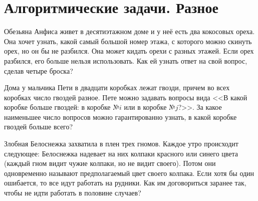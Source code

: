 

\section*{Алгоритмические задачи. Разное}


\begin{problems}

\item
Обезьяна Анфиса живет в десятиэтажном доме и у неё есть два кокосовых ореха.
Она хочет узнать, какой самый большой номер этажа, с которого можно скинуть
орех, но он бы не разбился.
Она может кидать орехи с разных этажей.
Если орех разбился, его больше нельзя использовать.
Как ей узнать ответ на свой вопрос, сделав четыре броска?

\item
Дома у мальчика Пети в двадцати коробках лежат гвозди, причем во всех коробках
число гвоздей разное.
Пете можно задавать вопросы вида
<<В какой коробке больше гвоздей: в коробке №$i$ или в коробке №$j$?>>.
За какое наименьшее число вопросов можно гарантированно узнать, в какой коробке
гвоздей больше всего?

\item
Злобная Белоснежка захватила в плен трех гномов.
Каждое утро происходит следующее: Белоснежка надевает на них колпаки красного
или синего цвета (каждый гном видит чужие колпаки, но не видит своего).
Потом они одновременно называют предполагаемый цвет своего колпака.
Если хотя бы один ошибается, то все идут работать на рудники.
Как им договориться заранее так, чтобы не идти работать в половине случаев?

\end{problems}

